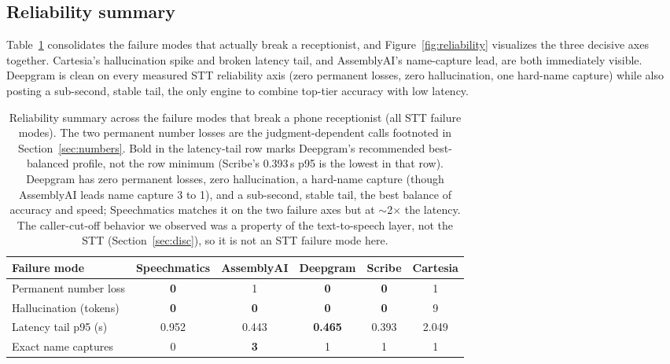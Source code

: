 \documentclass[11pt]{article}
\begin{document}
\subsection{Reliability summary}
\label{sec:relsum}

Table~\ref{tab:reliability} consolidates the failure modes that actually break a
receptionist, and Figure~\ref{fig:reliability} visualizes the three decisive
axes together. Cartesia's hallucination spike and broken latency tail, and
AssemblyAI's name-capture lead, are both immediately visible. Deepgram is clean
on every measured STT reliability axis (zero permanent losses, zero
hallucination, one hard-name capture) while also posting a sub-second, stable
tail, the only engine to combine top-tier accuracy with low latency.

\begin{table}[ht]
\centering
\small
\begin{tabular}{@{}lccccc@{}}
\toprule
\textbf{Failure mode} & \textbf{Speechmatics} & \textbf{AssemblyAI}
                      & \textbf{Deepgram} & \textbf{Scribe} & \textbf{Cartesia} \\
\midrule
Permanent number loss & \textbf{0} & 1 & \textbf{0} & \textbf{0} & 1 \\
Hallucination (tokens) & \textbf{0} & \textbf{0} & \textbf{0} & \textbf{0} & 9 \\
Latency tail p95 (s) & 0.952 & 0.443 & \textbf{0.465} & 0.393 & 2.049 \\
Exact name captures & 0 & \textbf{3} & 1 & 1 & 1 \\
\bottomrule
\end{tabular}
\caption{Reliability summary across the failure modes that break a phone
receptionist (all STT failure modes). The two permanent number losses are the
judgment-dependent calls footnoted in Section~\ref{sec:numbers}. Bold in the
latency-tail row marks Deepgram's recommended best-balanced profile, not the row
minimum (Scribe's 0.393\,s p95 is the lowest in that row). Deepgram has zero
permanent losses, zero hallucination, a hard-name capture (though AssemblyAI
leads name capture 3 to 1), and a sub-second, stable tail, the best balance of
accuracy and speed; Speechmatics matches it on the two failure axes but at
$\sim$2$\times$ the latency. The caller-cut-off behavior we observed was a
property of the text-to-speech layer, not the STT (Section~\ref{sec:disc}), so
it is not an STT failure mode here.}
\label{tab:reliability}
\end{table}
\end{document}
